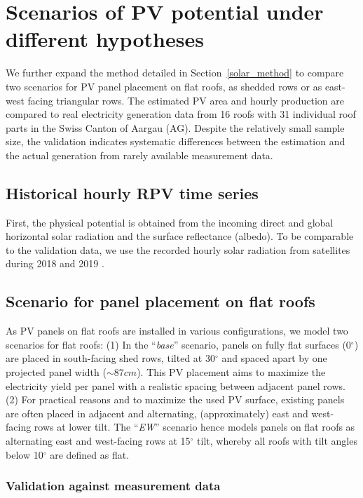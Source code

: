 \section{Scenarios of PV potential under different hypotheses}
\label{solar_scenarios}

We further expand the method detailed in Section~\ref{solar_method} to compare two scenarios for PV panel placement on flat roofs, as shedded rows or as east-west facing triangular rows. The estimated PV area and hourly production are compared to real electricity generation data from 16 roofs with 31 individual roof parts in the Swiss Canton of Aargau (AG). Despite the relatively small sample size, the validation indicates systematic differences between the estimation and the actual generation from rarely available measurement data. 

\subsection{Historical hourly RPV time series}

First, the physical potential is obtained from the incoming direct and global horizontal solar radiation and the surface reflectance (albedo). To be comparable to the validation data, we use the recorded hourly solar radiation from satellites during 2018 and 2019 \cite{stockli_daily_2013}. 

\subsection{Scenario for panel placement on flat roofs}
\label{scenario_EW}

As PV panels on flat roofs are installed in various configurations, we model two scenarios for flat roofs: (1) In the “\textit{base}” scenario, panels on fully flat surfaces (0$^\circ$) are placed in south-facing shed rows, tilted at 30$^\circ$ and spaced apart by one projected panel width ($\sim 87 cm$). This PV placement aims to maximize the electricity yield per panel with a realistic spacing between adjacent panel rows. (2) For practical reasons and to maximize the used PV surface, existing panels are often placed in adjacent and alternating, (approximately) east and west-facing rows at lower tilt. The “\textit{EW}” scenario hence models panels on flat roofs as alternating east and west-facing rows at 15$^\circ$ tilt, whereby all roofs with tilt angles below 10$^\circ$ are defined as flat. 

\subsubsection{Validation against measurement data}

